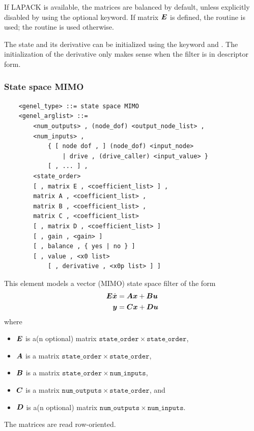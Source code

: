 If LAPACK is available, the matrices are balanced by default,
unless explicitly disabled by using the  optional keyword.
If matrix $\boldsymbol{E}$ is defined, the  routine is used;
the  routine is used otherwise.

The state and its derivative can be initialized using the keyword 
and .
The initialization of the derivative only makes sense when the filter
is in descriptor form.

\subsubsection{State space MIMO}
\label{sec:EL:GENEL:STATE-SPACE-MIMO}
\begin{verbatim}
    <genel_type> ::= state space MIMO
    <genel_arglist> ::=
        <num_outputs> , (node_dof) <output_node_list> ,
        <num_inputs> ,
            { [ node dof , ] (node_dof) <input_node>
                | drive , (drive_caller) <input_value> }
            [ , ... ] ,
        <state_order>
        [ , matrix E , <coefficient_list> ] ,
        matrix A , <coefficient_list> ,
        matrix B , <coefficient_list> ,
        matrix C , <coefficient_list>
        [ , matrix D , <coefficient_list> ]
        [ , gain , <gain> ]
        [ , balance , { yes | no } ]
        [ , value , <x0 list>
            [ , derivative , <x0p list> ] ]
\end{verbatim}
This element models a vector (MIMO) state space filter of the form
\begin{align*}
        \boldsymbol{E} \dot{\boldsymbol{x}} &= \boldsymbol{A}\boldsymbol{x}+\boldsymbol{B}\boldsymbol{u} \\
	\boldsymbol{y} &= \boldsymbol{C}\boldsymbol{x}+\boldsymbol{D}\boldsymbol{u}
\end{align*}
where
\begin{itemize}
\item $\boldsymbol{E}$ is a(n optional) matrix
	$\mathtt{state\_order} \times \mathtt{state\_order}$,
\item $\boldsymbol{A}$ is a matrix
	$\mathtt{state\_order} \times \mathtt{state\_order}$,
\item $\boldsymbol{B}$ is a matrix
	$\mathtt{state\_order} \times \mathtt{num\_inputs}$,
\item $\boldsymbol{C}$ is a matrix
	$\mathtt{num\_outputs} \times \mathtt{state\_order}$, and
\item $\boldsymbol{D}$ is a(n optional) matrix
	$\mathtt{num\_outputs} \times \mathtt{num\_inputs}$.
\end{itemize}
The matrices are read row-oriented.

